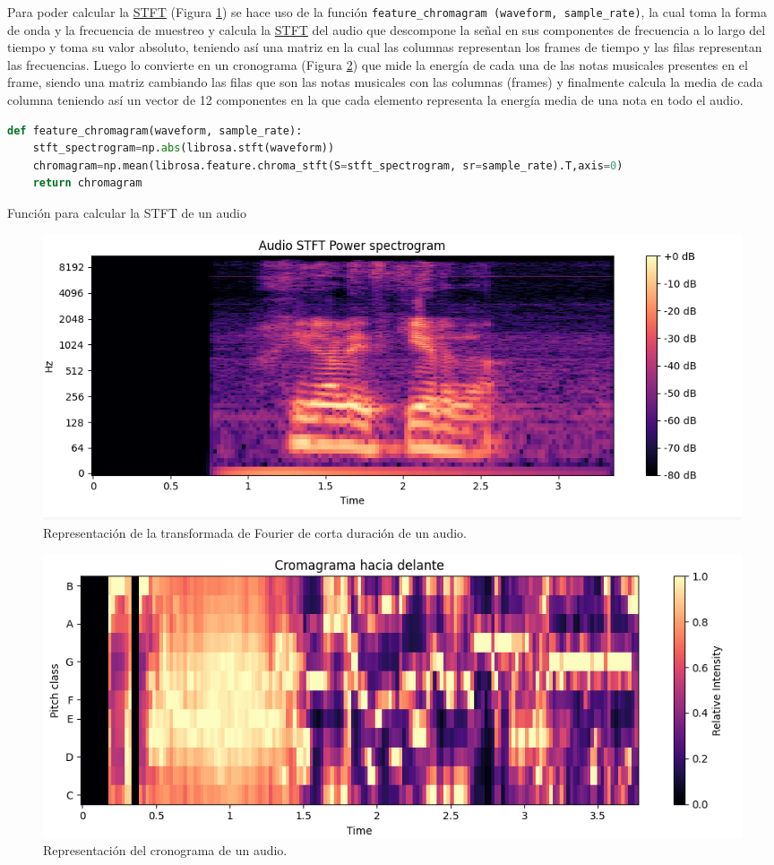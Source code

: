 Para poder calcular la \hyperlink{STFT}{STFT} (Figura \ref{fig:stft}) se hace uso de la función \verb|feature_chromagram (waveform, sample_rate)|, la cual toma la forma de onda y la frecuencia de muestreo y calcula la \hyperlink{STFT}{STFT} del audio que descompone la señal en sus componentes de frecuencia a lo largo del tiempo y toma su valor absoluto, teniendo así una matriz en la cual las columnas representan los frames de tiempo y las filas representan las frecuencias. Luego lo convierte en un cronograma (Figura \ref{fig:cronograma}) que mide la energía de cada una de las notas musicales presentes en el frame, siendo una matriz cambiando las filas que son las notas musicales con las columnas (frames) y finalmente calcula la media de cada columna teniendo así un vector de 12 componentes en la que cada elemento representa la energía media de una nota en todo el audio.


\begin{code}[H]
\begin{lstlisting}[language=Python]
def feature_chromagram(waveform, sample_rate):
    stft_spectrogram=np.abs(librosa.stft(waveform))
    chromagram=np.mean(librosa.feature.chroma_stft(S=stft_spectrogram, sr=sample_rate).T,axis=0)
    return chromagram
\end{lstlisting}
\caption[Función para calcular la STFT de un audio]{Función para calcular la STFT de un audio}
\label{cod:codejemplo6}
\end{code}

\begin{figure}[H]
  \centering
  \includegraphics[scale=0.4]{figs/stft_spectogram} %
  \caption{ Representación de la transformada de Fourier de corta duración de un audio.}
  \label{fig:stft}
\end{figure}

\begin{figure}[H]
  \centering
  \includegraphics[scale=0.4]{figs/cromagrama} %
  \caption{ Representación del cronograma de un audio.}
  \label{fig:cronograma}
\end{figure}


